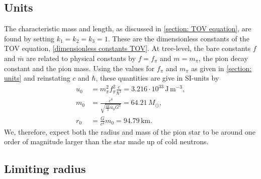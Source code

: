 \subsection{Units}

The characteristic mass and length, as discussed in \autoref{section: TOV equation}, are found by setting $k_1 = k_2 = k_3 = 1$.
These are the dimensionless constants of the TOV equation, \autoref{dimensionless constants TOV}.
At tree-level, the bare constants $f$ and $\bar m$ are related to physical constants by $f = f_\pi$ and $m = m_\pi$, the pion decay constant and the pion mass.
Using the values for $f_\pi$ and $m_\pi$ as given in \autoref{section: units} and reinstating $c$ and $\hbar$, these quantities are give in SI-units by
%
\begin{align}
    u_0 & =m_\pi^2 f_\pi^2 \frac{c}{\hbar^3}
    = 3.216\cdot 10^{33} \, \text{J}\,\text{m}^{-3}, \\
    m_0 & = \frac{c^4}{\sqrt{\frac{4 \pi}{ 3} u_0 G^3}} = 64.21\, M_\odot, \\
    r_0 & = \frac{G}{c^2} m_0 = 94.79 \, \text{km}.
\end{align}
%
We, therefore, expect both the radius and mass of the pion star to be around one order of magnitude larger than the star made up of cold neutrons.

\subsection{Limiting radius}

